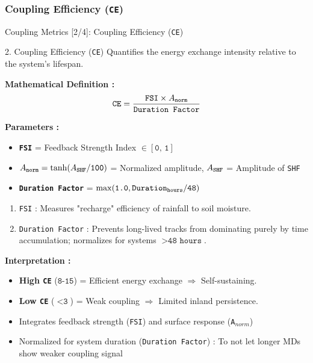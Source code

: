 \documentclass[8pt, aspectratio=169]{beamer}
\begin{document}
\subsubsection{Coupling Efficiency (\texttt{CE})}
\begin{frame}{Coupling Metrics [2/4]: Coupling Efficiency (\texttt{CE})}
    \vspace{-0.1cm}
    \footnotesize
    \begin{block}{2. Coupling Efficiency (\texttt{CE})}
        Quantifies the energy exchange intensity relative to the system's lifespan.

        \textbf{Mathematical Definition :}
        \begin{equation}
            \text{\texttt{CE}} = \frac{\text{\texttt{FSI}} \times A_{\text{\texttt{norm}}}}{\text{\texttt{Duration Factor}}}
            \label{eq:couplingeff}
        \end{equation}

        \textbf{Parameters :}
        \begin{itemize}
            \item \textbf{\texttt{FSI}} = Feedback Strength Index $\in [\texttt{0, 1}]$
            \item $A_{\text{\texttt{norm}}} = \tanh(A_{\text{\texttt{SHF}}} / \texttt{100})$ = Normalized amplitude, $A_{\text{\texttt{SHF}}}$ = Amplitude of \texttt{SHF}
            \item \textbf{\texttt{Duration Factor}} = $\max(\texttt{1.0}, \text{\texttt{Duration}}_{\text{\texttt{hours}}} / \texttt{48})$
        \end{itemize}

        \begin{enumerate}
            \item \texttt{FSI} : Measures "recharge" efficiency of rainfall to soil moisture.
            \item \texttt{Duration Factor} : Prevents long-lived tracks from dominating purely by time accumulation; normalizes for systems $>\texttt{48 hours}$.
        \end{enumerate}

        \vspace{0.2cm}
        \textbf{Interpretation :}
        \begin{itemize}
            \item \textbf{High \texttt{CE}} ($\texttt{8-15}$) = Efficient energy exchange $\Rightarrow$ Self-sustaining.
            \item \textbf{Low \texttt{CE}} ($<\texttt{3}$) = Weak coupling $\Rightarrow$ Limited inland persistence.
            \item Integrates feedback strength (\texttt{FSI}) and surface response (\texttt{A$_{norm}$})
            \item Normalized for system duration (\texttt{Duration Factor}) : To not let longer MDs show weaker coupling signal
        \end{itemize}


\end{block}
\end{frame}
\end{document}
